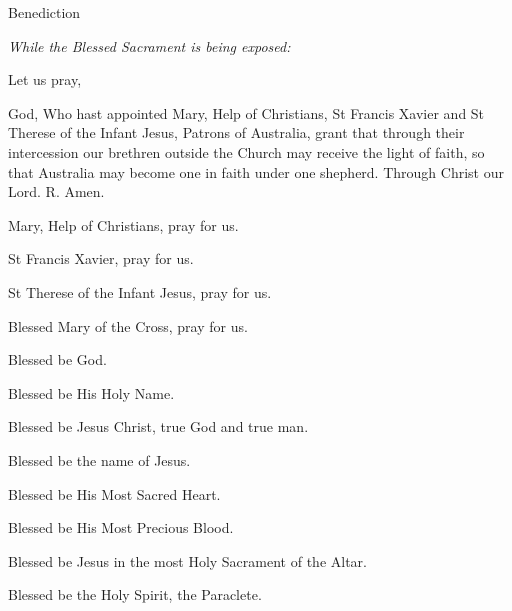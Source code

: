 

\beginpart Benediction %

\bigskip

{\noindent \it While the Blessed Sacrament is being exposed: }

\medskip



\bigskip

\noindent Let us pray,

\smallskip

God, Who hast appointed Mary, Help of Christians, 
St Francis Xavier and St Therese of the Infant Jesus, 
Patrons of Australia, grant that through their intercession 
our brethren outside the Church may receive the light of faith, 
so that Australia may become one in faith under one shepherd.  
Through Christ our Lord.  
\hfill \s R. Amen.

\medskip

Mary, Help of Christians, pray for us.

\smallskip

St Francis Xavier, pray for us.

\smallskip

St Therese of the Infant Jesus, pray for us. 

\smallskip

Blessed Mary of the Cross, pray for us. 

\goodbreak
\filbreak
\bigskip


\medskip



\bigskip



\smallskip

Blessed be God.

Blessed be His Holy Name.

Blessed be Jesus Christ, true God and true man.

Blessed be the name of Jesus.

Blessed be His Most Sacred Heart.

Blessed be His Most Precious Blood.

Blessed be Jesus in the most Holy Sacrament of the Altar.

Blessed be the Holy Spirit, the Paraclete.

